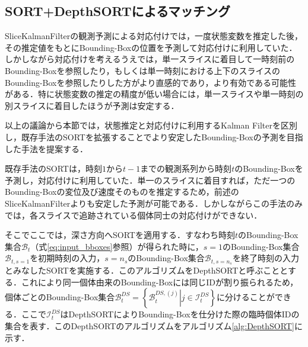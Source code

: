     \subsection{SORT+DepthSORTによるマッチング}
    SliceKalmanFilterの観測予測による対応付けでは，一度状態変数を推定した後，その推定値をもとにBounding-Boxの位置を予測して対応付けに利用していた．しかしながら対応付けを考えるうえでは，単一スライスに着目して一時刻前のBounding-Boxを参照したり，もしくは単一時刻における上下のスライスのBounding-Boxを参照したりした方がより直感的であり，より有効である可能性がある．特に状態変数の推定の精度が低い場合には，単一スライスや単一時刻の別スライスに着目したほうが予測は安定する．
    \par
    以上の議論から本節では，状態推定と対応付けに利用するKalman Filterを区別し，既存手法のSORTを拡張することでより安定したBounding-Boxの予測を目指した手法を提案する．
    \par
    既存手法のSORTは，時刻$1$から$t-1$までの観測系列から時刻$t$のBounding-Boxを予測し，対応付けに利用していた．単一のスライスに着目すれば，ただ一つのBounding-Boxの変位及び速度そのものを推定するため，前述のSliceKalmanFilterよりも安定した予測が可能である．しかしながらこの手法のみでは，各スライスで追跡されている個体同士の対応付けができない．
    \par
    そこでここでは，深さ方向へSORTを適用する．すなわち時刻$t$のBounding-Box集合$\mathcal{B}_t$（式\ref{eq:input_bboxes}参照）が得られた時に，$s=1$のBounding-Box集合$\mathcal{B}_{t,s=1}$を初期時刻の入力，$s=n_s$のBounding-Box集合$\mathcal{B}_{t,s=n_s}$を終了時刻の入力とみなしたSORTを実施する．このアルゴリズムをDepthSORTと呼ぶこととする．これにより同一個体由来のBounding-Boxには同じIDが割り振られるため，個体ごとのBounding-Box集合$\mathcal{B}_t^{DS} = \left\{\left.\mathcal{B}_t^{DS, (j)}\right|j \in \mathcal{I}_t^{DS}\right\}$に分けることができる．ここで$\mathcal{I}_t^{DS}$はDepthSORTによりBounding-Boxを仕分けた際の臨時個体IDの集合を表す．このDepthSORTのアルゴリズムをアルゴリズム\ref{alg:DepthSORT}に示す．
